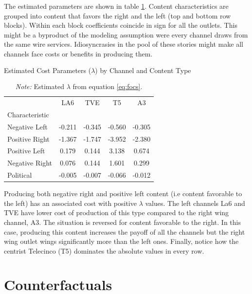 \documentclass[12pt]{article}
\begin{document}
	  
	
The estimated parameters are shown in table \ref{table:costs}. Content characteristics are grouped into content that favors the right and the left (top and bottom row blocks). Within each block coefficients coincide in sign for all the outlets. This might be a byproduct of the modeling assumption were  every channel draws from the same wire services. Idiosyncrasies in the pool of these stories might make all channels face costs or benefits in producing them. 


	
	
	\begin{table}[H]
				
		\caption{Estimated Cost Parameters ($\lambda$) by Channel and Content Type}
		
		\centering
		\begin{tabular}{lcccc}
			\toprule
			& LA6 & TVE & T5 & A3 \\
			Characteristic &  &  &  &  \\
			\midrule
			Negative Left & -0.211 & -0.345 & -0.560 & -0.305 \\
			Positive Right & -1.367 & -1.747 & -3.952 & -2.380 \\
			\hline
			Positive Left & 0.179 & 0.144 & 3.138 & 0.674 \\
			Negative Right & 0.076 & 0.144 & 1.601 & 0.299 \\
			\hline
			Political & -0.005 & -0.007 & -0.066 & -0.012 \\
			\bottomrule
		\end{tabular}
			\caption*{\textit{Note:} \small Estimated $\lambda$ from equation \ref{eq:focs}.}
	\label{table:costs}
	\end{table}




Producing both negative right and positive left content (i.e content favorable to the left) has an associated cost with positive $\lambda$ values. The left channels La6 and TVE have lower cost of production of this type compared to the right wing channel, A3.  The situation is reversed for content favorable to the right. In this case, producing this content increases the payoff of all the channels but the right wing outlet wings significantly more than the left ones. Finally, notice how the centrist Telecinco (T5) dominates the absolute values in every row.





\section{Counterfactuals}
\end{document}
